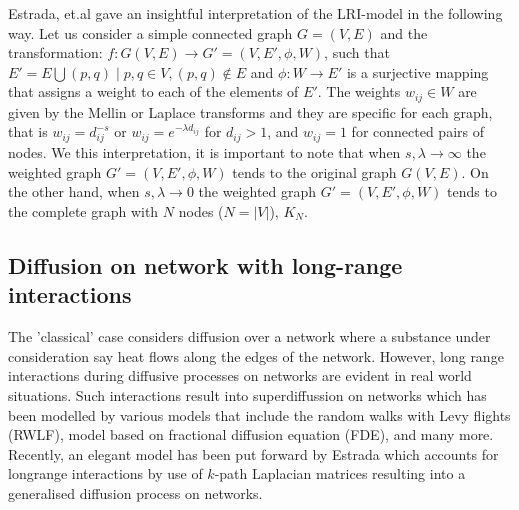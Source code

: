 \documentclass[10pt,a4paper]{article}
\begin{document}
        Estrada, et.al \citep{estrada2017long} gave an insightful interpretation of the  LRI-model in the following way.
        Let us consider a simple connected graph $G=(V,E)$ and the transformation: $f: G(V,E) \longrightarrow G'=(V, E', \phi, W)$, such that $E' ={E \bigcup (p,q)\mid p,q \in V, (p,q) \notin E} $ and $\phi:W \longrightarrow E'$ is a surjective mapping that assigns a weight to each of the elements of $E'$. The weights $w_{ij} \in W$ are given by the Mellin or Laplace transforms and they are specific for each graph, that is $w_{ij} = d_{ij}^{-s}$ or $w_{ij} = e^{-\lambda d_{ij}}$ for $d_{ij} >1$, and $w_{ij} =1$ for connected pairs of nodes. We this interpretation, it is important to note that when $ s, \lambda \longrightarrow \infty$ the weighted graph $G'=(V, E', \phi, W)$ tends to the original graph $G(V,E)$. On the other hand, when $ s, \lambda \longrightarrow 0$ the weighted graph $G'=(V, E', \phi, W)$ tends to the complete graph with $N$ nodes ($N = |V|$), $K_{N}$.
        
        
        \newpage
        
        \subsection{Diffusion on network with long-range interactions}
        The 'classical' case considers diffusion over a network where a substance under consideration say heat flows along the edges of the network. However, long range interactions during diffusive processes on networks are evident in real world situations. Such interactions result into superdiffussion on networks which has been modelled by various models that include the random walks with Levy flights (RWLF), model based on fractional diffusion equation (FDE), and many more. Recently, an elegant model has been put forward by Estrada \citep{estrada2017path} which accounts for longrange interactions by use of $k$-path Laplacian matrices resulting into a generalised diffusion process on networks.
        
\end{document}

